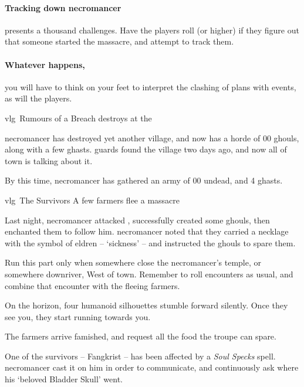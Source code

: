 \paragraph{Tracking down \gls{necromancer}}
presents a thousand challenges.
Have the players roll  (\tn[14] or higher) if they figure out that someone started the massacre, and attempt to track them.

\paragraph{Whatever happens,}
you will have to think on your feet to interpret the clashing of plans with events, as will the players.

{\gls{vlg}~\squash Rumours of a Breach}%
{ destroys  at the }%
\label{necroRumours}

\Gls{necromancer} has destroyed yet another \gls{village}, and now has a horde of 00 ghouls, along with a few ghasts.
\Glspl{guard} found the \gls{village} two days ago, and now all of \gls{town} is talking about it.

By this time, \gls{necromancer} has gathered an army of 00 undead, and 4 ghasts.

{\gls{vlg}~The Survivors}%
{A few farmers flee a massacre}%

\begin{exampletext}
  Last night, \gls{necromancer} attacked , successfully created some ghouls, then enchanted them to follow him.
  \Gls{necromancer} noted that they carried a necklage with the symbol of \gls{eldren} -- `\gls{sickness}' -- and instructed the ghouls to spare them.
\end{exampletext}

Run this part only when somewhere close the \gls{necromancer}'s temple, or somewhere downriver, West of \gls{town}.
Remember to roll encounters as usual, and combine that encounter with the fleeing farmers.

\begin{boxtext}
  On the horizon, four humanoid silhouettes stumble forward silently.
  Once they see you, they start running towards you.
\end{boxtext}

The farmers arrive famished, and request all the food the troupe can spare.

One of the survivors -- Fangkrist -- has been affected by a \textit{Soul Specks} spell.
\Gls{necromancer} cast it on him in order to communicate, and continuously ask where his `beloved Bladder Skull' went.

